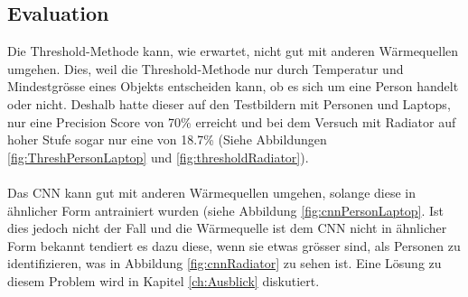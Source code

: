 \subsection{Evaluation}

Die Threshold-Methode kann, wie erwartet, nicht gut mit anderen Wärmequellen umgehen. Dies, weil die Threshold-Methode nur durch Temperatur und Mindestgrösse eines Objekts entscheiden kann, ob es sich um eine Person handelt oder nicht. Deshalb hatte dieser auf den Testbildern mit Personen und Laptops, nur eine Precision Score von 70\% erreicht und bei dem Versuch mit Radiator auf hoher Stufe sogar nur eine von 18.7\% (Siehe Abbildungen  \ref{fig:ThreshPersonLaptop} und \ref{fig:thresholdRadiator}).\\
\\
Das \gls{CNN} kann gut mit anderen Wärmequellen umgehen, solange diese in ähnlicher Form antrainiert wurden (siehe Abbildung \ref{fig:cnnPersonLaptop}. Ist dies jedoch nicht der Fall und die Wärmequelle ist dem \gls{CNN} nicht in ähnlicher Form bekannt tendiert es dazu diese, wenn sie etwas grösser sind, als Personen zu identifizieren, was in Abbildung \ref{fig:cnnRadiator} zu sehen ist. Eine Lösung zu diesem Problem wird in Kapitel \ref{ch:Ausblick} diskutiert. 

